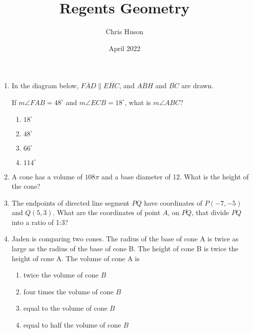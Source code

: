 \documentclass[12pt, oneside]{article}
\title{Regents Geometry}
\author{Chris Huson}
\date{April 2022}
\begin{document}
\begin{enumerate}[itemsep=2cm]
\item In the diagram below, $\overline{FAD} \parallel \overline{EHC}$, and $\overline{ABH}$ and $\overline{BC}$ are drawn.
\begin{center}
  \end{center}
If $m\angle FAB = 48^\circ$ and $m\angle ECB = 18^\circ$, what is $m\angle ABC$?
\begin{multicols}{2}
  \begin{enumerate}
    \item $18^\circ$
    \item $48^\circ$
    \item $66^\circ$
    \item $114^\circ$
  \end{enumerate}
\end{multicols}

\item A cone has a volume of $108\pi$ and a base diameter of 12. What is the
height of the cone?

\item The endpoints of directed line segment $PQ$ have coordinates of
$P(-7,-5)$ and $Q(5,3)$. What are the coordinates of point $A$, on $\overline{PQ}$,
that divide $\overline{PQ}$ into a ratio of 1:3?

\item Jaden is comparing two cones. The radius of the base of cone A is
twice as large as the radius of the base of cone B. The height of cone
B is twice the height of cone A. The volume of cone A is
\begin{enumerate}
  \item twice the volume of cone $B$
  \item four times the volume of cone $B$
  \item equal to the volume of cone $B$
  \item equal to half the volume of cone $B$
\end{enumerate}


\end{enumerate}
\end{document}
